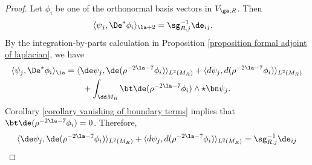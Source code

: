 \documentclass[hidelinks, 12pt, oneside, reqno]{amsart}
\begin{document}
\begin{proof}
Let $\phi_i$ be one of the orthonormal basis vectors in $V_{\ga,R}$. Then
    \begin{align*}
        \langle \psi_j, \De^* \phi_i \rangle_{\la+2}  &= \sg_{R,j}^{-1} \de_{ij}. 
    \end{align*}
    By the integration-by-parts calculation in Proposition \ref{proposition formal adjoint of laplacian}, we have
    \begin{align*}
    \langle \psi_j, \De^* \phi_i \rangle_{\la} &= \langle \de \psi_j , \de (\rho^{-2\la - 7} \phi_i) \rangle_{L^2(M_R)} + \langle d \psi_j , d (\rho^{-2\la - 7} \phi_i) \rangle_{L^2(M_R)} \\
    &\qquad + \int_{\dd M_R} \bt \de(\rho^{-2\la - 7} \phi_i) \wedge \star \bn \psi_j.
    \end{align*}
    Corollary \ref{corollary vanishing of boundary terms} implies that $\bt \de (\rho^{-2\la - 7} \phi_i) = 0$. Therefore,
    \[
    \langle \de \psi_j , \de (\rho^{-2\la - 7} \phi_i) \rangle_{L^2(M_R)} + \langle d \psi_j , d (\rho^{-2\la - 7} \phi_i) \rangle_{L^2(M_R)} = \sg^{-1}_{R,j}\de_{ij}
    \]
    

\end{proof}
\end{document}
